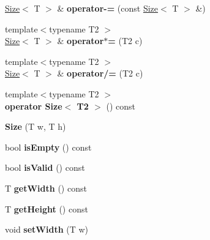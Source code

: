 \begin{DoxyCompactItemize}
\item 
\hypertarget{class_size_a9f6d6f2e34d1d3ff3c288bb25e08ad8f}{
\hyperlink{class_size}{Size}$<$ T $>$ \& {\bfseries operator-\/=} (const \hyperlink{class_size}{Size}$<$ T $>$ \&)}
\label{class_size_a9f6d6f2e34d1d3ff3c288bb25e08ad8f}

\item 
\hypertarget{class_size_aab38c063fa04e4f22cfccab0f6417433}{
{\footnotesize template$<$typename T2 $>$ }\\\hyperlink{class_size}{Size}$<$ T $>$ \& {\bfseries operator$\ast$=} (T2 c)}
\label{class_size_aab38c063fa04e4f22cfccab0f6417433}

\item 
\hypertarget{class_size_ae23ef0c1e3fc6bd7054d6553fb6e8a00}{
{\footnotesize template$<$typename T2 $>$ }\\\hyperlink{class_size}{Size}$<$ T $>$ \& {\bfseries operator/=} (T2 c)}
\label{class_size_ae23ef0c1e3fc6bd7054d6553fb6e8a00}

\item 
\hypertarget{class_size_ae7c404e21e544f5e95a194a03c84f251}{
{\footnotesize template$<$typename T2 $>$ }\\{\bfseries operator Size$<$ T2 $>$} () const }
\label{class_size_ae7c404e21e544f5e95a194a03c84f251}

\item 
\hypertarget{class_size_af1c5ad71aa40371fa62aa71ee81c3dde}{
{\bfseries Size} (T w, T h)}
\label{class_size_af1c5ad71aa40371fa62aa71ee81c3dde}

\item 
\hypertarget{class_size_a2feb6af7868053ec23b4eea7f2cc64dd}{
bool {\bfseries isEmpty} () const }
\label{class_size_a2feb6af7868053ec23b4eea7f2cc64dd}

\item 
\hypertarget{class_size_a72f90a2c7648b173a81d1535c45e1168}{
bool {\bfseries isValid} () const }
\label{class_size_a72f90a2c7648b173a81d1535c45e1168}

\item 
\hypertarget{class_size_a8f02c9a3825f72db52762c8c6dbac9f9}{
T {\bfseries getWidth} () const }
\label{class_size_a8f02c9a3825f72db52762c8c6dbac9f9}

\item 
\hypertarget{class_size_aaca336454ac27a1359a7f815da660ab4}{
T {\bfseries getHeight} () const }
\label{class_size_aaca336454ac27a1359a7f815da660ab4}

\item 
\hypertarget{class_size_a121262181e42aa1ca35b87eb072230fc}{
void {\bfseries setWidth} (T w)}
\label{class_size_a121262181e42aa1ca35b87eb072230fc}


\end{DoxyCompactItemize}
